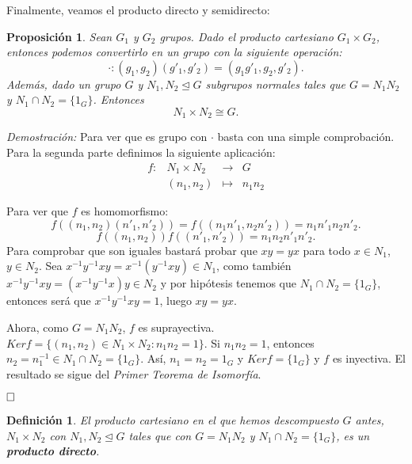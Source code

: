 \documentclass[12pt]{article}
\newtheorem{proposition}[theorem]{Proposición}
\newtheorem{definition}[theorem]{Definición}
\begin{document}
Finalmente, veamos el producto directo y semidirecto:

\begin{proposition}Sean $G_{1}$ y $G_{2}$ grupos. Dado el producto cartesiano $G_{1} \times G_{2}$, entonces podemos convertirlo en un grupo con la siguiente operación: $$\cdot \colon (g_{1},g_{2})(g'_{1},g'_{2})=(g_{1}g'_{1},g_{2},g'_{2}).$$
Además, dado un grupo $G$ y $N_{1},N_{2} \unlhd G$ subgrupos normales tales que $G=N_{1}N_{2}$ y $N_{1}\cap N_{2}=\lbrace 1_{G} \rbrace$. Entonces $$N_{1} \times N_{2} \cong G.$$
\end{proposition}
\emph{Demostración: }Para ver que es grupo con $\cdot$ basta con una simple comprobación. Para la segunda parte definimos la siguiente aplicación: 
$$\begin{array}{rccl}
f\colon &N_{1}\times N_{2} & \longrightarrow & G\\
&(n_{1},n_{2})& \longmapsto &n_{1}n_{2}
\end{array}
$$ 

Para ver que $f$ es homomorfismo: $$f((n_{1},n_{2})(n'_{1},n'_{2}))=f((n_{1}n'_{1},n_{2}n'_{2}))=n_{1}n'_{1}n_{2}n'_{2}.$$
$$f((n_{1},n_{2}))f((n'_{1},n'_{2}))=n_{1}n_{2}n'_{1}n'_{2}.$$
Para comprobar que son iguales bastará probar que $xy=yx$ para todo $x\in N_{1}$, $y\in N_{2}$. Sea $x^{-1}y^{-1}xy=x^{-1}(y^{-1}xy)\in N_{1}$, como también $x^{-1}y^{-1}xy=(x^{-1}y^{-1}x)y \in N_{2}$ y por hipótesis tenemos que $N_{1}\cap N_{2} = \lbrace 1_{G}\rbrace$, entonces será que $x^{-1}y^{-1}xy=1$, luego $xy=yx$. 

Ahora, como $G=N_{1}N_{2}$, $f$ es suprayectiva. $Ker f = \lbrace (n_{1},n_{2}) \in N_{1}\times N_{2}:n_{1}n_{2}=1 \rbrace$. Si $n_{1}n_{2}=1$, entonces $n_{2}=n_{1}^{-1}\in N_{1}\cap N_{2}=\lbrace 1_{G}\rbrace$. Así, $n_{1}=n_{2}=1_{G}$ y $Ker f=\lbrace 1_{G} \rbrace$ y $f$ es inyectiva. El resultado se sigue del \textit{Primer Teorema de Isomorfía}.

$\hfill \square$

\begin{definition}El producto cartesiano en el que hemos descompuesto $G$ antes, $N_{1}\times N_{2}$ con $N_{1}, N_{2}\unlhd G$ tales que con $G=N_{1}N_{2}$ y $N_{1}\cap N_{2}= \lbrace 1_{G} \rbrace$, es un \textbf{producto directo}. 
\end{definition}
\end{document}
